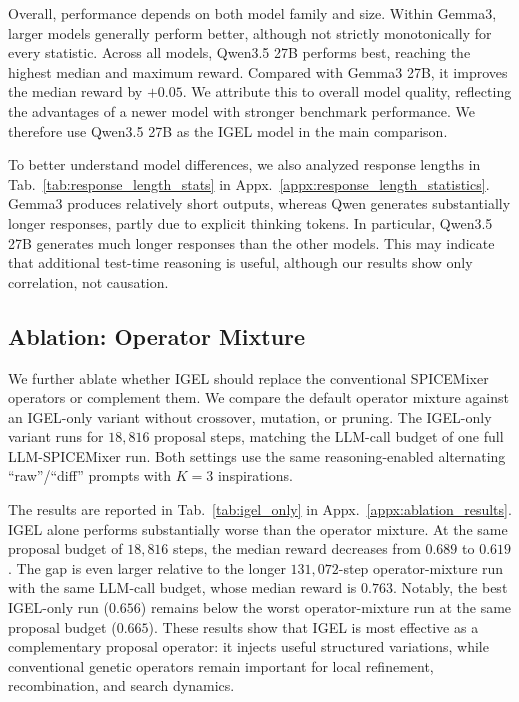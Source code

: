 \documentclass[sigconf,pbalance]{acmart_modified}
\newcommand{\squeezeSubSection}{}
\newcommand{\llmspm}{LLM-SPICE\-Mixer}
\newcommand{\spm}{SPICE\-Mixer}
\begin{document}
Overall, performance depends on both model family and size. Within Gemma3, larger models generally perform better, although not strictly monotonically for every statistic. Across all models, Qwen3.5 27B performs best, reaching the highest median and maximum reward. Compared with Gemma3 27B, it improves the median reward by $+0.05$. We attribute this to overall model quality, reflecting the advantages of a newer model with stronger benchmark performance. We therefore use Qwen3.5 27B as the IGEL model in the main comparison.

To better understand model differences, we also analyzed response lengths in Tab.~\ref{tab:response_length_stats} in Appx.~\ref{appx:response_length_statistics}. Gemma3 produces relatively short outputs, whereas Qwen generates substantially longer responses, partly due to explicit thinking tokens. In particular, Qwen3.5 27B generates much longer responses than the other models. This may indicate that additional test-time reasoning is useful, although our results show only correlation, not causation.

\squeezeSubSection\subsection{Ablation: Operator Mixture}
\label{subsec:igel_only:sec:results}
We further ablate whether IGEL should replace the conventional \spm{} operators or complement them. We compare the default operator mixture against an IGEL-only variant without crossover, mutation, or pruning. The IGEL-only variant runs for $18{,}816$ proposal steps, matching the LLM-call budget of one full \llmspm{} run. Both settings use the same reasoning-enabled alternating ``raw''/``diff'' prompts with $K=3$ inspirations.

The results are reported in Tab.~\ref{tab:igel_only} in Appx.~\ref{appx:ablation_results}. IGEL alone performs substantially worse than the operator mixture. At the same proposal budget of $18{,}816$ steps, the median reward decreases from $0.689$ to $0.619$. The gap is even larger relative to the longer $131{,}072$-step operator-mixture run with the same LLM-call budget, whose median reward is $0.763$. Notably, the best IGEL-only run ($0.656$) remains below the worst operator-mixture run at the same proposal budget ($0.665$). These results show that IGEL is most effective as a complementary proposal operator: it injects useful structured variations, while conventional genetic operators remain important for local refinement, recombination, and search dynamics.
\end{document}
